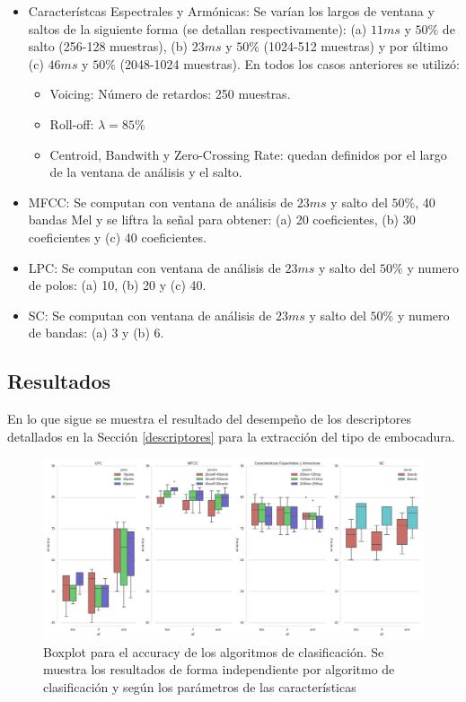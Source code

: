 \documentclass{article}
\begin{document}
\begin{itemize}
	\item Característcas Espectrales y Armónicas: Se varían los largos de ventana y saltos de la siguiente forma (se detallan respectivamente): (a) $11ms$ y $50\%$ de salto (256-128 muestras), (b) $23ms$ y $50\%$  (1024-512 muestras) y por último (c) $46ms$ y $50\%$  (2048-1024 muestras). En todos los casos anteriores se utilizó: 
	\begin{itemize}
		\item Voicing: Número de retardos: 250 muestras.
		\item Roll-off: $\lambda=85\%$
		\item Centroid, Bandwith y Zero-Crossing Rate: quedan definidos por el largo de la ventana de análisis y el salto.
	\end{itemize}
	\item MFCC: Se computan con ventana de análisis de $23ms$ y salto del $50\%$, 40 bandas Mel y se liftra la señal para obtener: (a) 20 coeficientes, (b) 30 coeficientes y (c) 40 coeficientes.
	\item LPC: Se computan con ventana de análisis de $23ms$ y salto del $50\%$ y numero de polos: (a) 10, (b) 20 y (c) 40.
	\item SC: Se computan con ventana de análisis de $23ms$ y salto del $50\%$ y numero de bandas: (a) 3 y (b) 6.
\end{itemize}

\subsection{Resultados}

En lo que sigue se muestra el resultado del desempeño de los descriptores detallados en la Sección \ref{descriptores} para la extracción del tipo de embocadura.
\medskip

\begin{figure}[H]
\begin{center}
\includegraphics[width=1\textwidth]{exp1_comparacion} 
\caption{Boxplot para el accuracy de los algoritmos de clasificación. Se muestra los resultados de forma independiente por algoritmo de clasificación y según los parámetros de las características}
\label{fig:exp1_comparacion}
\end{center}
\end{figure}
\end{document}
